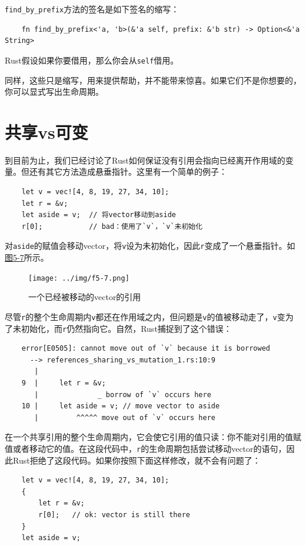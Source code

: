 \texttt{find\_by\_prefix}方法的签名是如下签名的缩写：
\begin{verbatim}
    fn find_by_prefix<'a, 'b>(&'a self, prefix: &'b str) -> Option<&'a String>
\end{verbatim}
Rust假设如果你要借用，那么你会从\texttt{self}借用。

同样，这些只是缩写，用来提供帮助，并不能带来惊喜。如果它们不是你想要的，你可以显式写出生命周期。

\section{共享vs可变}\label{ShareVSMut}

到目前为止，我们已经讨论了Rust如何保证没有引用会指向已经离开作用域的变量。但还有其它方法造成悬垂指针。这里有一个简单的例子：
\begin{verbatim}
    let v = vec![4, 8, 19, 27, 34, 10];
    let r = &v;
    let aside = v;  // 将vector移动到aside
    r[0];           // bad：使用了`v`，`v`未初始化
\end{verbatim}

对\texttt{aside}的赋值会移动vector，将\texttt{v}设为未初始化，因此\texttt{r}变成了一个悬垂指针。如\hyperref[f5-7]{图5-7}所示。

\begin{figure}[htbp]
    \centering
    \texttt{[image: ../img/f5-7.png]}
    \caption{一个已经被移动的vector的引用}
    \label{f5-7}
\end{figure}

尽管\texttt{r}的整个生命周期内\texttt{v}都还在作用域之内，但问题是\texttt{v}的值被移动走了，\texttt{v}变为了未初始化，而\texttt{r}仍然指向它。自然，Rust捕捉到了这个错误：
\begin{verbatim}
    error[E0505]: cannot move out of `v` because it is borrowed
      --> references_sharing_vs_mutation_1.rs:10:9
       |
    9  |     let r = &v;
       |              _ borrow of `v` occurs here
    10 |     let aside = v; // move vector to aside
       |         ^^^^^ move out of `v` occurs here
\end{verbatim}

在一个共享引用的整个生命周期内，它会使它引用的值只读：你不能对引用的值赋值或者移动它的值。在这段代码中，\texttt{r}的生命周期包括尝试移动vector的语句，因此Rust拒绝了这段代码。如果你按照下面这样修改，就不会有问题了：
\begin{verbatim}
    let v = vec![4, 8, 19, 27, 34, 10];
    {
        let r = &v;
        r[0];   // ok: vector is still there
    }
    let aside = v;
\end{verbatim}

